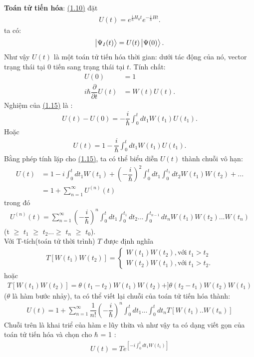 \documentclass{report}
\begin{document}
\textbf{Toán tử tiến hóa}: \hyperref[eq1.10]{(1.10)} đặt
\begin{align}\label{eq1.13}
	U(t) = e^{\frac{i}{\hbar}H_0t} e^{-\frac{i}{\hbar}Ht}.
\end{align}
ta có:
\begin{align*}
	\ket{\Psi_{I}(t)} = U(t)\ket{\Psi(0)}.
\end{align*}
Như vậy $U(t)$ là một toán tử tiến hóa thời gian: dưới tác động của nó, vector trạng thái tại 0 tiến sang trạng thái tại $t$. Tính chất:
\begin{align}
	U(0)                                      & = 1         \\
	\label{eq1.15}
	i\hbar \dfrac{\partial}{\partial{t}} U(t) & = W(t)U(t).
\end{align}
Nghiệm của \hyperref[eq1.15]{(1.15)} là :
\begin{align*}
	U(t) - U(0) = -\dfrac{i}{\hbar} \int_{0}^{t}dt_1 W(t_1)U(t_1).
\end{align*}
Hoặc
\begin{align}\label{eq1.16}
	U(t) = 1 -\dfrac{i}{\hbar} \int_{0}^{t}dt_1 W(t_1)U(t_1).
\end{align}
Bằng phép tính lặp cho \hyperref[eq1.15]{(1.15)}, ta có thể biểu diễn $U(t)$ thành chuỗi vô hạn:
\begin{align}
	U(t) & = 1- i \int_{0}^{t}dt_1 W(t_1) + \left( - \dfrac{i}{\hbar} \right)^2 \int_{0}^{t}dt_{1}\int_{0}^{t_1}dt_2W(t_1)W(t_2) + ... \\
	\label{eq1.17}
	     & = 1 + \sum_{n=1}^{\infty}U^(n)(t)
\end{align}
trong đó
\begin{align}
	U^{(n)}(t) =\sum_{n=1}^{\infty} \left( -\dfrac{i}{\hbar} \right)^{n} \int_{0}^{t}dt_{1}\int_{0}^{t_1}dt_2...\int_{0}^{t_{n-1}}dt_n W(t_1)W(t_2)...W(t_n)
\end{align}
(t $\geq$ $t_1$ $\geq$ $t_2$...$\geq$ $t_n$ $\geq$ $t_0$).\\
Với T-tích(toán tử thời trình) $T$ được định nghĩa
\begin{align}
	T\left[ W(t_1) W(t_2) \right] =
	\begin{cases}
		W(t_1)W(t_2), \text{với}\; t_1 > t_2 \\
		W(t_2)W(t_1), \text{với}\; t_1 > t_2.
	\end{cases}
\end{align}
hoặc
\begin{align}
	T\left[ W(t_1) W(t_2) \right] = \theta(t_1 - t_2)W(t_1)W(t_2) + ]\theta(t_2 - t_1)W(t_2)W(t_1)
\end{align}
($\theta$ là hàm bước nhảy), ta có thể viết lại chuỗi của toán tử tiến hóa thành:
\begin{align}
	U(t) = 1 + \sum_{n=1}^{\infty}\dfrac{1}{n!}\left(-\dfrac{i}{\hbar}\right)^{n}
	\int_{0}^{t}dt_1...\int_{0}^{t}dt_n T\left[W(t_1)..W(t_n)\right]
\end{align}
Chuỗi trên là khai triể của hàm e lũy thừa và như vậy ta có dạng viết gọn của toán tử tiến hóa và chọn cho $\hbar$ = 1 :
\begin{align}
	U(t) = Te^{\left[ -i \int_{0}^{t}dt_1 W(t_1) \right]}
\end{align}
\end{document}
